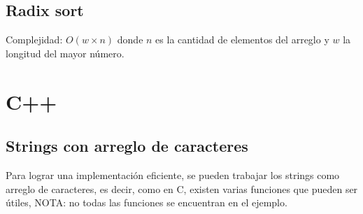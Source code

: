 \documentclass[10pt,letterpaper,twocolumn]{article}
\newcommand{\source}[1]{
  
  \dotfill
}
\begin{document}
  \subsection{Radix sort}
  Complejidad: $O(w \times n)$ donde $n$ es la cantidad de elementos del arreglo y $w$ la longitud del mayor número.\\
  \source{./src/radixSort.cpp}

\section{C++}
  \subsection{Strings con arreglo de caracteres}
  Para lograr una implementación eficiente, se pueden trabajar los strings como arreglo de caracteres, es decir, como en C, existen varias funciones que pueden ser útiles, NOTA: no todas las funciones se encuentran en el ejemplo.
  \source{./src/getsScanfGetline.cpp}
\end{document}
